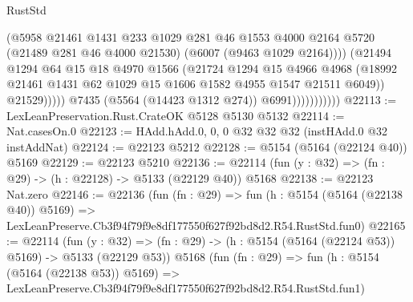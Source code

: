 \begin{lexlean}{RustStd}
\begin{coremodule}
                                    (@5958
                                      @21461
                                      @1431
                                      @233
                                      @1029
                                      @281
                                      @46
                                      @1553
                                      @4000
                                      @2164
                                      @5720
                                      (@21489 @281 @46 @4000 @21530)
                                      (@6007 (@9463 @1029 @2164))))
                                  (@21494
                                    @1294
                                    @64
                                    @15
                                    @18
                                    @4970
                                    @1566
                                    (@21724
                                      @1294
                                      @15
                                      @4966
                                      @4968
                                      (@18992
                                        @21461
                                        @1431
                                        @62
                                        @1029
                                        @15
                                        @1606
                                        @1582
                                        @4955
                                        @1547
                                        @21511
                                        @6049))
                                    @21529)))))
                          @7435
                          (@5564 (@14423 @1312 @274))
                          @6991)))))))))))
@22113 := LexLeanPreservation.Rust.CrateOK @5128 @5130 @5132
@22114 := Nat.casesOn.{0}
@22123 := HAdd.hAdd.{0, 0, 0} @32 @32 @32 (instHAdd.{0} @32 instAddNat)
@22124 := @22123 @5212
@22128 := @5154 (@5164 (@22124 @40)) @5169
@22129 := @22123 @5210
@22136 := @22114 (fun (y : @32) => (fn : @29) -> (h : @22128) -> @5133 (@22129 @40)) @5168
@22138 := @22123 Nat.zero
@22146 := @22136
    (fun (fn : @29) =>
    fun (h : @5154 (@5164 (@22138 @40)) @5169) =>
    LexLeanPreserve.Cb3f94f79f9e8df177550f627f92bd8d2.R54.RustStd.fun0)
@22165 := @22114
    (fun (y : @32) => (fn : @29) -> (h : @5154 (@5164 (@22124 @53)) @5169) -> @5133 (@22129 @53))
    @5168
    (fun (fn : @29) =>
    fun (h : @5154 (@5164 (@22138 @53)) @5169) =>
    LexLeanPreserve.Cb3f94f79f9e8df177550f627f92bd8d2.R54.RustStd.fun1)

\end{coremodule}
\end{lexlean}
